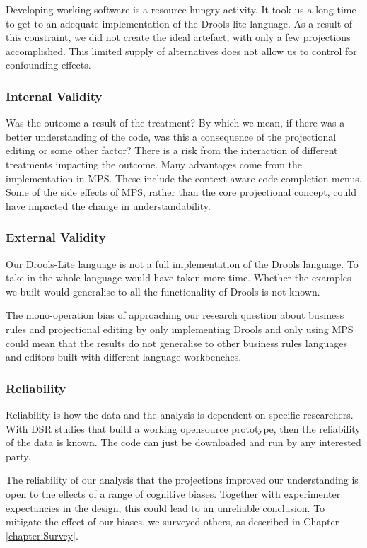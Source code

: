 Developing working software is a resource-hungry activity. 
It took us a long time to get to an adequate implementation of the Drools-lite language.
As a result of this constraint, we did not create the ideal artefact, with only a few projections accomplished.
This limited supply of alternatives does not allow us to control for confounding effects.

\subsubsection{Internal Validity}
Was the outcome a result of the treatment?
By which we mean, if there was a better understanding of the code, was this a consequence of the projectional editing or some other factor?
There is a risk from the interaction of different treatments impacting the outcome.
Many advantages come from the implementation in MPS.
These include the context-aware code completion menus.
Some of the side effects of MPS, rather than the core projectional concept, could have impacted the change in understandability.

\subsubsection{External Validity}
Our Drools-Lite language is not a full implementation of the Drools language.
To take in the whole language would have taken more time.
Whether the examples we built would generalise to all the functionality of Drools is not known.

The mono-operation bias of approaching our research question about business rules and projectional editing by only implementing Drools and only using MPS could mean that the results do not generalise to other business rules languages and editors built with different language workbenches. 

\subsubsection{Reliability}
Reliability is how the data and the analysis is dependent on specific researchers.
With DSR studies that build a working opensource prototype, then the reliability of the data is known.
The code can just be downloaded and run by any interested party.  

The reliability of our analysis that the projections improved our understanding is open to the effects of a range of cognitive biases. 
Together with experimenter expectancies in the design, this could lead to an unreliable conclusion. 
To mitigate the effect of our biases, we surveyed others, as described in Chapter \ref{chapter:Survey}.
